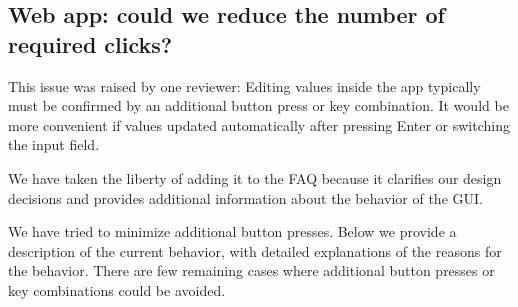 \documentclass[a4paper,11pt]{article}
\begin{document}
 \subsection{Web app: could we reduce the number of required clicks?}

 This issue was raised by one reviewer: Editing values inside the app typically must be confirmed by an additional button press or key combination. It would be more convenient if values updated automatically after pressing Enter or switching the input field.


 We have taken the liberty of adding it to the FAQ because it clarifies our design decisions and provides additional information about the behavior of the GUI.



 We have tried to minimize additional button presses. Below we provide a description of the current behavior, with detailed explanations of the reasons for the behavior. There are few remaining cases where additional button presses or key combinations could be avoided.
\end{document}
